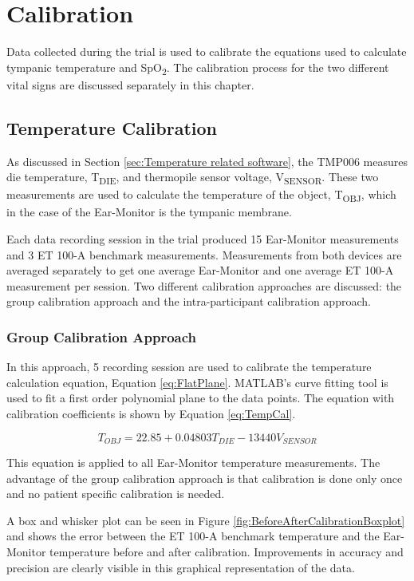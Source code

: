 \chapter{Calibration}
\label{chp:Calibration}
Data collected during the trial is used to calibrate the equations used to calculate tympanic temperature and SpO\textsubscript{2}. The calibration process for the two different vital signs are discussed separately in this chapter.

\section{Temperature Calibration}
As discussed in Section \ref{sec:Temperature related software}, the TMP006 measures die temperature, T\textsubscript{DIE}, and thermopile sensor voltage, V\textsubscript{SENSOR}. These two measurements are used to calculate the temperature of the object, T\textsubscript{OBJ}, which in the case of the Ear-Monitor is the tympanic membrane.

\medskip

Each data recording session in the trial produced 15 Ear-Monitor measurements and 3 ET 100-A benchmark measurements. Measurements from both devices are averaged separately to get one average Ear-Monitor and one average ET 100-A measurement per session. Two different calibration approaches are discussed: the group calibration approach and the intra-participant calibration approach.

\subsection{Group Calibration Approach}
In this approach, 5 recording session are used to calibrate the temperature calculation equation, Equation \ref{eq:FlatPlane}. MATLAB's curve fitting tool is used to fit a first order polynomial plane to the data points. The equation with calibration coefficients is shown by Equation \ref{eq:TempCal}.

\begin{equation}
\label{eq:TempCal}
T_{OBJ}=22.85+ 0.04803 T_{DIE}-13440 V_{SENSOR}
\end{equation}


This equation is applied to all Ear-Monitor temperature measurements. The advantage of the group calibration approach is that calibration is done only once and no patient specific calibration is needed.

\medskip

A box and whisker plot can be seen in Figure \ref{fig:BeforeAfterCalibrationBoxplot} and shows the error between the ET 100-A benchmark temperature and the Ear-Monitor temperature before and after calibration. Improvements in accuracy and precision are clearly visible in this graphical representation of the data.


